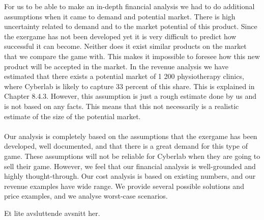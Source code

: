 For us to be able to make an in-depth financial analysis we had to do additional assumptions when it came to demand and potential market. There is high uncertainty related to demand and to the market potential of this product. Since the exergame has not been developed yet it is very difficult to predict how successful it can become. Neither does it exist similar products on the market that we compare the game with. This makes it impossible to foresee how this new product will be accepted in the market. In the revenue analysis we have estimated that there exists a potential market of 1 200 physiotherapy clinics, where Cyberlab is likely to capture 33 percent of this share. This is explained in Chapter 8.4.3. However, this assumption is just a rough estimate done by us and is not based on any facts. This means that this not necessarily is a realistic estimate of the size of the potential market. \\ \\
Our analysis is completely based on the assumptions that the exergame has been developed, well documented, and that there is a great demand for this type of game. These assumptions will not be reliable for Cyberlab when they are going to sell their game. However, we feel that our financial analysis is well-grounded and highly thought-through. Our cost analysis is based on existing numbers, and our revenue examples have wide range. We provide several possible solutions and price examples, and we analyse worst-case scenarios.  

Et lite avsluttende avsnitt her.



